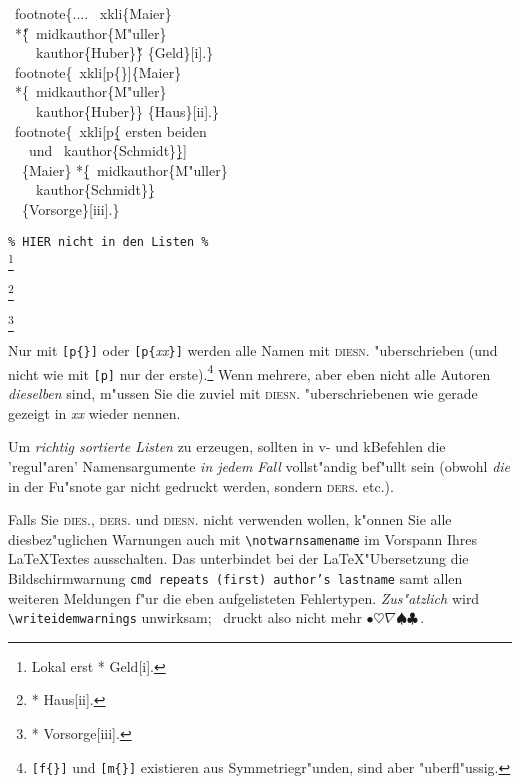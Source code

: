 \documentclass[12pt,a4paper]{article}
\newcommand{\pbs}{\string\ \unskip}
\newcommand{\bs}{\protect\pbs}
\begin{document}
\Doppelbox
{\bs footnote\{.... \bs xkli\{Maier\} 
  \\ \ *\H{\{}\bs midkauthor\{M"uller\} 
        \\ \ \ \ \bs kauthor\{Huber\}\H{\}} \{Geld\}[i].\}
 \\[1ex] \bs footnote\{\bs xkli[p\{\}]\{Maier\} 
  \\ \  *\{\bs midkauthor\{M"uller\} 
        \\ \ \ \ \bs kauthor\{Huber\}\} \{Haus\}[ii].\}
 \\[1ex] \bs footnote\{\bs xkli[p\b{\b{\{}} ersten beiden 
 \\ \ \ \ und \bs kauthor\{Schmidt\}\b{\b{\}}}]
 \\ \ \ \{Maier\} *\b{\{}\bs midkauthor\{M"uller\} 
 \\ \ \ \ \bs kauthor\{Schmidt\}\b{\}} 
 \\ \ \ \{Vorsorge\}[iii].\}
}
{\texttt{\% HIER nicht in den Listen \%}
 \\[3ex]
 \footnote{Lokal erst  
    *{ } {Geld}[i].}
                
 \footnote{ 
    *{ } {Haus}[ii].}
                
 \footnote{ 
    *{ } {Vorsorge}[iii].}
}


\noindent\label{p}%
Nur mit \verb|[p{}]| oder \verb|[p{|\textit{xx}\verb|}]| werden alle 
Namen mit \textsc{diesn.} "uberschrieben (und nicht wie mit \verb|[p]| 
nur der erste).\footnote{\texttt{[f\{\}]} und \texttt{[m\{\}]} existieren aus 
Symmetriegr"unden, sind aber "uberfl"ussig.} Wenn mehrere, aber eben 
nicht alle Autoren \textit{dieselben} sind, m"ussen Sie die zuviel mit
\textsc{diesn.} "uberschriebenen wie gerade gezeigt in \textit{xx}
wieder nennen. 

Um \textit{richtig sortierte Listen} zu erzeugen, sollten in v- 
und k\fhy Befehlen die 'regul"aren' Namensargumente
\textit{in jedem Fall} vollst"andig bef"ullt sein (obwohl \textit{die} 
in der Fu"snote gar nicht gedruckt werden, sondern \textsc{ders.} etc.).

Falls Sie \textsc{dies.}, \textsc{ders.} und \textsc{diesn.} nicht
verwenden wollen, k"onnen Sie alle diesbez"uglichen Warnungen auch 
mit \verb|\notwarnsamename| im Vorspann Ihres \LaTeX\hy Textes
ausschalten. Das unterbindet bei der \LaTeX\hy "Ubersetzung die 
Bildschirmwarnung {\small\texttt{cmd repeats (first) author's 
lastname}} samt allen weiteren Meldungen f"ur die eben 
aufgelisteten Fehlertypen. \textit{Zus"atzlich} wird 
\verb|\writeidemwarnings| unwirksam; \BibArts\ druckt also nicht 
mehr {\small$\bullet\heartsuit\nabla\spadesuit\clubsuit$}\,.
\end{document}
